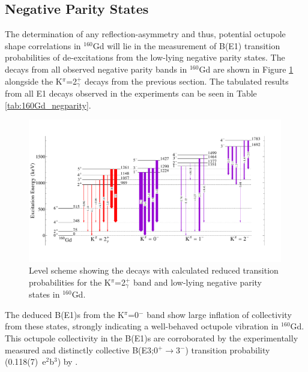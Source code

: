 \subsection{Negative Parity States}\label{sec:160Gd_negparity}
The determination of any reflection-asymmetry and thus, potential octupole shape correlations in $^{160}$Gd will lie in the measurement of B(E1) transition probabilities of de-excitations from the low-lying negative parity states. The decays from all observed negative parity bands in $^{160}$Gd are shown in Figure \ref{fig:160Gd_Octupole} alongside the K$^\pi$=2$^+_\gamma$ decays from the previous section. The tabulated results from all E1 decays observed in the experiments can be seen in Table \ref{tab:160Gd_negparity}.

\begin{center}
\begin{figure}[h!]
\includegraphics[width=0.99\textwidth]{figures/160Gd_OctupoleRevised.pdf}
\caption{Level scheme showing the decays with calculated reduced transition probabilities for the K$^\pi$=2$^+_\gamma$ band and low-lying negative parity states in $^{160}$Gd. \label{fig:160Gd_Octupole}}
\end{figure}
\end{center}                                    
                                                

 The deduced B(E1)s from the K$^\pi$=0$^-$ band show large inflation of collectivity from these states, strongly indicating a well-behaved octupole vibration in $^{160}$Gd. This octupole collectivity in the B(E1)s are corroborated by the experimentally measured and distinctly collective B(E3;0$^+\rightarrow$3$^-$) transition probability (0.118(7)~e$^2$b$^3$) by \cite{McGowan_BE2_1981}.

